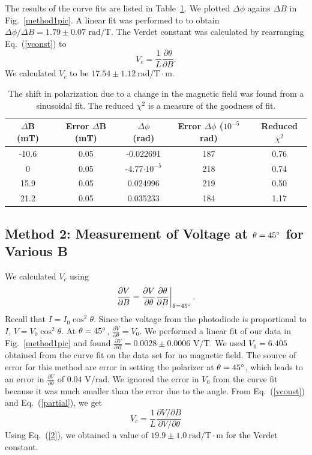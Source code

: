 \documentclass[prb,preprint]{revtex4-1}
\begin{document}
{{The results of the curve fits are listed in Table~\ref{shift table}. We plotted $\Delta \phi$ agains $\Delta B$ in Fig.~\ref{method1pic}. A linear fit was performed to to obtain $\Delta \phi/\Delta B=1.79 \pm 0.07\textrm{~rad/T}$. The Verdet constant was calculated by rearranging Eq.~(\ref{vconst}) to
\begin{equation}
V_{c} =\frac{1}{L} \frac{\partial \theta}{\partial B}. 
\end{equation}
We calculated $V_c$ to be $17.54 \pm 1.12 \mathrm{~rad/T} \cdot \textrm{m}$.
\begin{table}
    \begin{ruledtabular}
        \begin{tabular}{ccccc}
            $\Delta$B (mT)&Error $\Delta$B (mT)&$\Delta \phi$ (rad)&Error $\Delta\phi$ ($10^{-5}$ rad)&Reduced $\chi^2$ \\  \hline
            -10.6 & 0.05 & -0.022691 & 187 & 0.76 \\
            0     & 0.05 & -4.77$\cdot10^{-5}$ & 218 & 0.74 \\
            15.9  & 0.05 & 0.024996  & 219 & 0.50 \\
            21.2  & 0.05 & 0.035233  & 184 & 1.17
        \end{tabular}
    \end{ruledtabular}
\caption{\label{shift table}The shift in polarization due to a change in the magnetic field was found from a sinusoidal fit. The reduced $\chi^2$ is a measure of the goodness of fit.}
\end{table}
}


\subsection{Method 2: Measurement of Voltage at $\theta = 45\degree$ for Various B}
{We calculated $V_{c}$ using 
\begin{equation}
\label{partial}
\left. \frac{\partial V}{\partial B}=\frac{\partial V}{\partial \theta} \frac{\partial \theta}{\partial B}\right|_{\theta=45\degree}.
\end{equation}
Recall that $I=I_{0}\cos^2{\theta}$. Since the voltage from the photodiode is proportional to $I$, $V=V_{0}\cos^2{\theta}$. At $\theta = 45\degree$, $\frac{\partial V}{\partial \theta}=V_0$. 
We performed a linear fit of our data in Fig.~\ref{method1pic} and found $\frac{\partial V}{\partial B}=0.0028\pm 0.0006 \textrm{~V/T}$. We used $V_0=6.405$ obtained from the curve fit on the data set for no magnetic field. The source of error for this method are error in setting the polarizer at $\theta=45\degree$, which leads to an error in $\frac{\partial V}{\partial \theta}$ of $0.04\textrm{~V/rad}$. We ignored the error in $V_0$ from the curve fit because it was much smaller than the error due to the angle.
From Eq.~(\ref{vconst}) and Eq.~(\ref{partial}), we get
\begin{equation}
\label{2}
V_{c} =\frac{1}{L}  \frac{\partial V/\partial B}{\partial V/\partial \theta} 
\end{equation}
Using  Eq.~(\ref{2}), we obtained a value of $19.9 \pm 1.0 \mathrm{~rad/T} \cdot \textrm{m}$ for the Verdet constant. 

}}
\end{document}
